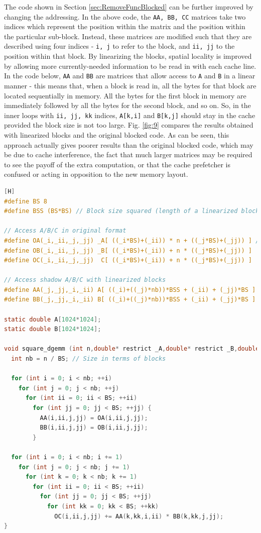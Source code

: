\documentclass[10pt]{article}
\begin{document}
The code shown in Section \ref{sec:RemoveFuncBlocked} can be further improved by changing the addressing. In the above code, the {\tt AA, BB, CC} matrices take two indices which represent the position within the matrix and the position within the particular sub-block. Instead, these matrices are modified such that they are described using four indices - {\tt i, j} to refer to the block, and {\tt ii, jj} to the position within that block. By linearizing the blocks, spatial locality is improved by allowing more currently-needed information to be read in with each cache line. In the code below, {\tt AA} and {\tt BB} are matrices that allow access to {\tt A} and {\tt B} in a linear manner - this means that, when a block is read in, all the bytes for that block are located sequentially in memory. All the bytes for the first block in memory are immediately followed by all the bytes for the second block, and so on. So, in the inner loops with {\tt ii, jj, kk} indices, {\tt A[k,i]} and {\tt B[k,j]} should stay in the cache provided the block size is not too large. Fig. \ref{fig:9} compares the results obtained with linearized blocks and the original blocked code. As can be seen, this approach actually gives poorer results than the original blocked code, which may be due to cache interference, the fact that much larger matrices may be required to see the payoff of the extra computation, or that the cache prefetcher is confused or acting in opposition to the new memory layout.

\begin{lstlisting}[language=C, basicstyle=\small][H]
#define BS 8
#define BSS (BS*BS) // Block size squared (length of a linearized block)

// Access A/B/C in original format
#define OA(_i,_ii,_j,_jj) _A[ ((_i*BS)+(_ii)) * n + ((_j*BS)+(_jj)) ] // Transposed
#define OB(_i,_ii,_j,_jj) _B[ ((_i*BS)+(_ii)) + n * ((_j*BS)+(_jj)) ]
#define OC(_i,_ii,_j,_jj)  C[ ((_i*BS)+(_ii)) + n * ((_j*BS)+(_jj)) ]

// Access shadow A/B/C with linearized blocks
#define AA(_j,_jj,_i,_ii) A[ ((_i)+((_j)*nb))*BSS + (_ii) + (_jj)*BS ]
#define BB(_j,_jj,_i,_ii) B[ ((_i)+((_j)*nb))*BSS + (_ii) + (_jj)*BS ]

static double A[1024*1024];
static double B[1024*1024];

void square_dgemm (int n,double* restrict _A,double* restrict _B,double* restrict C){
  int nb = n / BS; // Size in terms of blocks

  for (int i = 0; i < nb; ++i)
    for (int j = 0; j < nb; ++j)
      for (int ii = 0; ii < BS; ++ii)
        for (int jj = 0; jj < BS; ++jj) {
          AA(i,ii,j,jj) = OA(i,ii,j,jj);
          BB(i,ii,j,jj) = OB(i,ii,j,jj);
        }

  for (int i = 0; i < nb; i += 1)
    for (int j = 0; j < nb; j += 1)
      for (int k = 0; k < nb; k += 1)
        for (int ii = 0; ii < BS; ++ii)
          for (int jj = 0; jj < BS; ++jj)
            for (int kk = 0; kk < BS; ++kk)
              OC(i,ii,j,jj) += AA(k,kk,i,ii) * BB(k,kk,j,jj);
}
\end{lstlisting}
\end{document}

